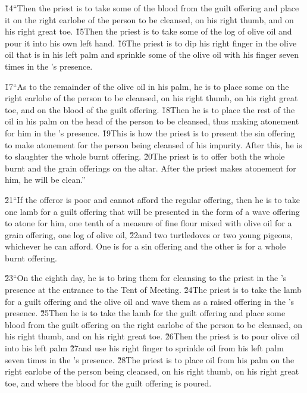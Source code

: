 \v{14}``Then the priest is to take some of the blood from the guilt offering and place it on the right earlobe of the person to be cleansed, on his right thumb, and on his right great toe. \v{15}Then the priest is to take some of the log of olive oil and pour it into his own left hand. \v{16}The priest is to dip his right finger in the olive oil that is in his left palm and sprinkle some of the olive oil with his finger seven times in the 's presence.

\v{17}``As to the remainder of the olive oil in his palm, he is to place some on the right earlobe of the person to be cleansed, on his right thumb, on his right great toe, and on the blood of the guilt offering. \v{18}Then he is to place the rest of the oil in his palm on the head of the person to be cleansed, thus making atonement for him in the 's presence. \v{19}This is how the priest is to present the sin offering to make atonement for the person being cleansed of his impurity. After this, he is to slaughter the whole burnt offering. \v{20}The priest is to offer both the whole burnt and the grain offerings on the altar. After the priest makes atonement for him, he will be clean.''

\v{21}``If the offeror is poor and cannot afford the regular offering, then he is to take one lamb for a guilt offering that will be presented in the form of a wave offering to atone for him, one tenth of a measure of fine flour mixed with olive oil for a grain offering, one log of olive oil, \v{22}and two turtledoves or two young pigeons, whichever he can afford. One is for a sin offering and the other is for a whole burnt offering.

\v{23}``On the eighth day, he is to bring them for cleansing to the priest in the 's presence at the entrance to the Tent of Meeting. \v{24}The priest is to take the lamb for a guilt offering and the olive oil and wave them as a raised offering in the 's presence. \v{25}Then he is to take the lamb for the guilt offering and place some blood from the guilt offering on the right earlobe of the person to be cleansed, on his right thumb, and on his right great toe. \v{26}Then the priest is to pour olive oil into his left palm \v{27}and use his right finger to sprinkle oil from his left palm seven times in the 's presence. \v{28}The priest is to place oil from his palm on the right earlobe of the person being cleansed, on his right thumb, on his right great toe, and where the blood for the guilt offering is poured.

